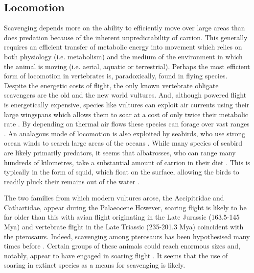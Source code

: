 \documentclass[a4paper,12pt]{article}
\begin{document}
\subsection*{Locomotion}
Scavenging depends more on the ability to efficiently move over large areas than does predation because of the inherent unpredictability of carrion. 
This generally requires an efficient transfer of metabolic energy into movement which relies on both physiology (i.e. metabolism) and the medium of the environment in which the animal is moving (i.e. aerial, aquatic or terrestrial).
Perhaps the most efficient form of locomotion in vertebrates is, paradoxically, found in flying species. 
Despite the energetic costs of flight, the only known vertebrate obligate scavengers are the old and the new world vultures. 
And, although powered flight is energetically expensive, species like vultures can exploit air currents using their large wingspans which allows them to soar at a cost of only twice their metabolic rate \citep{hedenstrom1993migration,spivey2014analysing}. %
By depending on thermal air flows these species can forage over vast ranges \citep{spiegel2013factors}. 
An analagous mode of locomotion is also exploited by seabirds, who use strong ocean winds to search large areas of the oceans \citep{norberg2012vertebrate,thaxter2012seabird}. 
While many species of seabird are likely primarily predators, it seems that albatrosses, who can range many hundreds of kilometres, take a substantial amount of carrion in their diet \citep{croxall1994dead}. 
This is typically in the form of squid, which float on the surface, allowing the birds to readily pluck their remains out of the water \citep{croxall1994dead}. 

The two families from which modern vultures arose, the Accipitridae and Cathartidae, appear during the Palaeocene \citep[66 - 56 Million years ago (Mya); ][]{Jetz2012, Jarvis2014} %
However, soaring flight is likely to be far older than this with avian flight originating in the Late Jurassic (163.5-145 Mya) and vertebrate flight in the Late Triassic (235-201.3 Mya) coincident with the pterosaurs. 
Indeed, scavenging among pterosaurs has been hypothesised many times before \citep{witton2008reappraisal}. 
Certain groups of these animals could reach enormous sizes \citep[e.g. Azhdarchids with wingspans of 11 metres; ][]{witton2010size} and, notably, appear to have engaged in soaring flight \citep{witton2010size}.
It seems that the use of soaring in extinct species as a means for scavenging is likely. 
\end{document}

